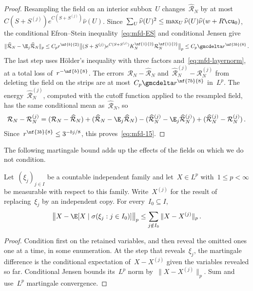 \documentclass[11pt]{amsart}
\begin{document}
\begin{proof}
Resampling the field on an interior subbox~$U$ changes~$\widehat{\mathcal R}_N$ by at most~$C(S+S^{(j)})e^{C(S+S^{(j)})}\widehat\nu(U)$. Since~$\sum_U\widehat\nu(U)^2\leq\max_U\widehat\nu(U)\widehat\nu(w+R\cu_0)$, the conditional Efron--Stein inequality~\eqref{eq:mfd-ES} and conditional Jensen give
\begin{equation*}
	\|\widehat{\mathcal R}_N-\E_j\widehat{\mathcal R}_N\|_p
	\leq C_pr^{\nf{b}{2}}
	\bigl\|(S+S^{(j)})e^{C(S+S^{(j)})}K_N^{\nf{1}{2}}\mathcal R_N^{\nf{1}{2}}\bigr\|_p
	\leq C_p\gmcdelta r^{\nf{3b}{8}}\,.
\end{equation*}
The last step uses H\"older's inequality with three factors and~\eqref{eq:mfd-layernorm}, at a total loss of~$r^{-\nf{b}{8}}$. The errors~$\mathcal R_N-\widehat{\mathcal R}_N$ and~$\widehat{\mathcal R}_N^{(j)}-\mathcal R_N^{(j)}$ from deleting the field on the strips are at most~$C_p\gmcdelta r^{\nf{7b}{8}}$ in~$L^p$. The energy~$\widehat{\mathcal R}_N^{(j)}$, computed with the cutoff function applied to the resampled field, has the same conditional mean as~$\widehat{\mathcal R}_N$, so
\begin{equation}
	\mathcal R_N-\mathcal R_N^{(j)}=(\mathcal R_N-\widehat{\mathcal R}_N)+(\widehat{\mathcal R}_N-\E_j\widehat{\mathcal R}_N)
	-(\widehat{\mathcal R}_N^{(j)}-\E_j\widehat{\mathcal R}_N^{(j)})+(\widehat{\mathcal R}_N^{(j)}-\mathcal R_N^{(j)})\,.
	\label{eq:mfd-fourterm}
\end{equation}
Since~$r^{\nf{3b}{8}}\leq3^{-bj/8}$, this proves~\eqref{eq:mfd-15}.
\end{proof}

The following martingale bound adds up the effects of the fields on which we do not condition.

\begin{lemma}
\label{mfd:lem-resampling-sum}
Let~$(\xi_j)_{j\in I}$ be a countable independent family and let~$X\in L^p$ with~$1\leq p<\infty$ be measurable with respect to this family. Write~$X^{(j)}$ for the result of replacing~$\xi_j$ by an independent copy. For every~$I_0\subseteq I$,
\begin{equation*}
	\bigl\|X-\E[X\mid\sigma(\xi_j:j\in I_0)]\bigr\|_p
	\leq\sum_{j\notin I_0}\|X-X^{(j)}\|_p\,.
\end{equation*}
\end{lemma}

\begin{proof}
Condition first on the retained variables, and then reveal the omitted ones one at a time, in some enumeration. At the step that reveals~$\xi_j$, the martingale difference is the conditional expectation of~$X-X^{(j)}$ given the variables revealed so far. Conditional Jensen bounds its~$L^p$ norm by~$\|X-X^{(j)}\|_p$. Sum and use~$L^p$ martingale convergence.
\end{proof}
\end{document}
